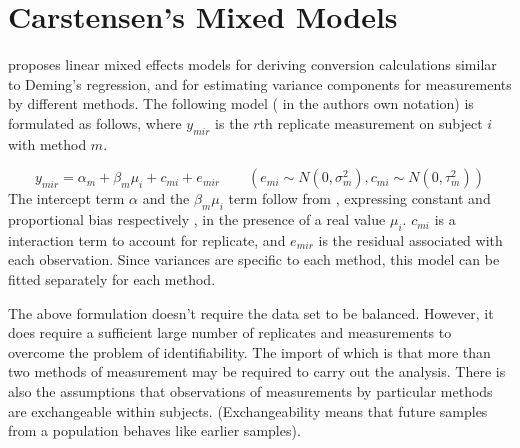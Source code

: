 \documentclass{report}
\begin{document}


\section{Carstensen's Mixed Models}

\citet{BXC2004} proposes linear mixed effects models for deriving
conversion calculations similar to Deming's regression, and for
estimating variance components for measurements by different
methods. The following model ( in the authors own notation) is
formulated as follows, where $y_{mir}$ is the $r$th replicate
measurement on subject $i$ with method $m$.

\begin{equation}
	y_{mir}  = \alpha_{m} + \beta_{m}\mu_{i} + c_{mi} + e_{mir} \qquad
	( e_{mi} \sim N(0,\sigma^{2}_{m}), c_{mi} \sim N(0,\tau^{2}_{m}))
\end{equation}
The intercept term $\alpha$ and the $\beta_{m}\mu_{i}$ term follow
from \citet{DunnSEME}, expressing constant and proportional bias
respectively , in the presence of a real value $\mu_{i}.$
$c_{mi}$ is a interaction term to account for replicate, and
$e_{mir}$ is the residual associated with each observation.
Since variances are specific to each method, this model can be
fitted separately for each method.

The above formulation doesn't require the data set to be balanced.
However, it does require a sufficient large number of replicates
and measurements to overcome the problem of identifiability. The
import of which is that more than two methods of measurement may
be required to carry out the analysis. There is also the
assumptions that observations of measurements by particular
methods are exchangeable within subjects. (Exchangeability means
that future samples from a population behaves like earlier
samples).
\end{document}
